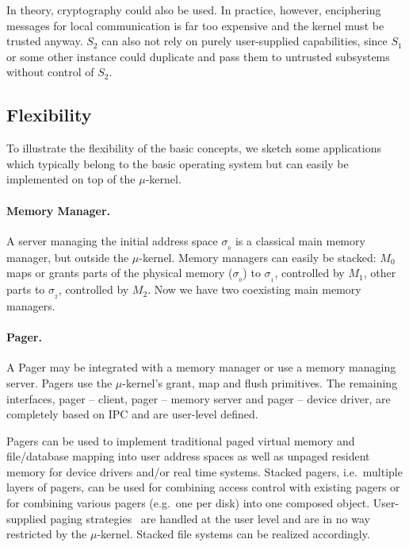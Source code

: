 \documentclass[a4paper,11pt,twoside,dvips]{book}
\newcommand{\micro}{$\mu$}
\begin{document}
In theory, cryptography could also be used. In practice, however,
enciphering messages for local communication is far too expensive and the
kernel must be trusted anyway.
$S_2$ can also not rely on purely user-supplied capabilities, since
$S_1$ or some other instance could duplicate and pass them to untrusted
subsystems without control of $S_2$. 
 
 
 
 
\subsection{Flexibility}                 \label{flexibility} 
 
To illustrate the flexibility of the basic concepts, we sketch some
applications which typically belong to the basic operating system but can
easily be implemented on top of the \micro-kernel.
 
 
\paragraph{Memory Manager.} 
A server managing the initial address space
$\sigma_{_0}$ is a classical main memory manager, but outside the
\micro-kernel. Memory managers can easily be stacked: $M_0$ maps or grants
parts of the physical memory ($\sigma_{_0}$) to $\sigma_{_1}$, controlled by
$M_1$, other parts to $\sigma_{_2}$, controlled by $M_2$. Now we have two
coexisting main memory managers. 
 
 
\paragraph{Pager.} 
A Pager may be integrated with a memory manager or use a memory 
managing server. Pagers use the \micro-kernel's grant, map and flush
primitives. The remaining interfaces, pager -- client, pager -- memory server
and pager -- device driver, are completely based on IPC and are user-level
defined.
 
Pagers can be used to implement traditional paged virtual memory and
file/database mapping into user address spaces as well as unpaged resident
memory for device drivers and/or real time systems. Stacked pagers, i.e.\
multiple layers of pagers, can be used for combining access control with
existing pagers or for combining various pagers (e.g.\ one per disk) into one
composed object. User-supplied paging
strategies~\cite{lee:HiPEC,cao:file-caching} are handled at the user level
and are in no way restricted by the \micro-kernel. Stacked file systems
\cite{khalidi:extfiles} can be realized accordingly. 
 
\end{document}
